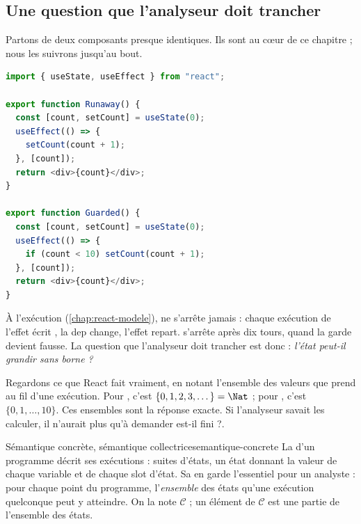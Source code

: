 \subsection{Une question que l'analyseur doit trancher}

Partons de deux composants presque identiques. Ils sont au cœur de ce
chapitre ; nous les suivrons jusqu'au bout.

\begin{lstlisting}[language=TypeScript,caption={Deux compteurs pilotés par un effet (\file{/tmp/ch03/counter.tsx}, repris de \file{tests/fixtures/widening.tsx})},label={lst:interpretation-abstraite-counter}]
import { useState, useEffect } from "react";

export function Runaway() {
  const [count, setCount] = useState(0);
  useEffect(() => {
    setCount(count + 1);
  }, [count]);
  return <div>{count}</div>;
}

export function Guarded() {
  const [count, setCount] = useState(0);
  useEffect(() => {
    if (count < 10) setCount(count + 1);
  }, [count]);
  return <div>{count}</div>;
}
\end{lstlisting}

À l'exécution (\cref{chap:react-modele}),  ne s'arrête jamais :
chaque exécution de l'effet écrit , la dep  change,
l'effet repart.  s'arrête après dix tours, quand la garde
 devient fausse. La question que l'analyseur doit trancher
est donc : \emph{l'état  peut-il grandir sans borne ?}

Regardons ce que React fait vraiment, en notant l'ensemble des valeurs que
 prend au fil d'une exécution. Pour , c'est
$\{0,1,2,3,\dots\} = \Nat$ ; pour , c'est $\{0,1,\dots,10\}$. Ces
ensembles sont la réponse exacte. Si l'analyseur savait les calculer, il
n'aurait plus qu'à demander \og est-il fini ?\fg{}.

\begin{definition}{Sémantique concrète, sémantique collectrice}{semantique-concrete}
  La  d'un programme décrit ses exécutions : suites
  d'états, un état donnant la valeur de chaque variable et de chaque slot
  d'état. Sa  en garde l'essentiel pour un
  analyste : pour chaque point du programme, l'\emph{ensemble} des états
  qu'une exécution quelconque peut y atteindre. On la note $\mathcal{C}$ ; un
  élément de $\mathcal{C}$ est une partie de l'ensemble des états.
\end{definition}

